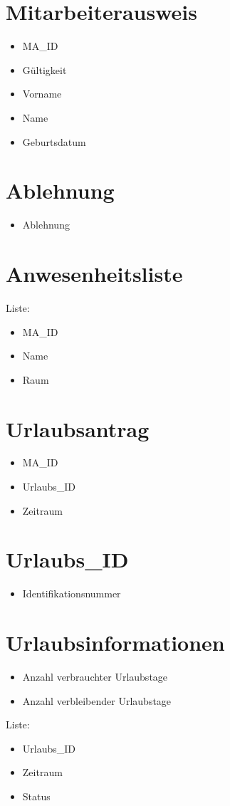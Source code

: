 \section{Mitarbeiterausweis}
\begin{itemize}
\item MA\_ID
\item Gültigkeit
\item Vorname
\item Name
\item Geburtsdatum
\end{itemize}
\section{Ablehnung}
\begin{itemize}
\item Ablehnung
\end{itemize}
\section{Anwesenheitsliste}
Liste: 
\begin{itemize}
\item MA\_ID
\item Name
\item Raum
\end{itemize}
\section{Urlaubsantrag}
\begin{itemize}
\item MA\_ID
\item Urlaubs\_ID
\item Zeitraum
\end{itemize}
\section{Urlaubs\_ID}
\begin{itemize}
\item Identifikationsnummer
\end{itemize}
\section{Urlaubsinformationen}
\begin{itemize}
\item Anzahl verbrauchter Urlaubstage
\item Anzahl verbleibender Urlaubstage
\end{itemize}
Liste: 
\begin{itemize}
\item Urlaubs\_ID
\item Zeitraum
\item Status
\end{itemize}

